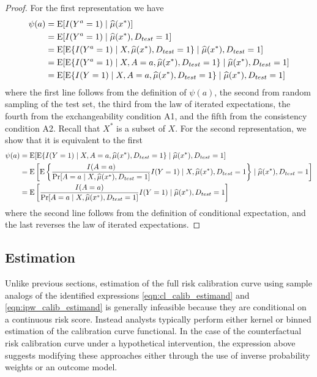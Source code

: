 \begin{proof}
    For the first representation we have 
    \begin{align*}
        \psi(a) &= \operatorname{E}[I(Y^a = 1) \mid \widehat{\mu}(x^*)] \\
        & = \operatorname{E}[I(Y^a = 1) \mid \widehat{\mu}(x^*), D_{test} = 1] \\
        & = \operatorname{E}[\operatorname{E}\{I(Y^a = 1) \mid X, \widehat{\mu}(x^*), D_{test} = 1\}\mid \widehat{\mu}(x^*), D_{test} = 1] \\
        & = \operatorname{E}[\operatorname{E}\{I(Y^a = 1) \mid X, A = a, \widehat{\mu}(x^*), D_{test} = 1\}\mid \widehat{\mu}(x^*), D_{test} = 1] \\
        & = \operatorname{E}[\operatorname{E}\{I(Y = 1) \mid X, A = a, \widehat{\mu}(x^*), D_{test} = 1\}\mid \widehat{\mu}(x^*), D_{test} = 1]
    \end{align*}
    where the first line follows from the definition of $\psi(a)$, the second from random sampling of the test set, the third from the law of iterated expectations, the fourth from the exchangeability condition A1, and the fifth from the consistency condition A2. Recall that $X^*$ is a subset of $X$. For the second representation, we show that it is equivalent to the first 
    \begin{align*}
        \psi(a) &= \operatorname{E}[\operatorname{E}\{I(Y = 1) \mid X, A = a, \widehat{\mu}(x^*), D_{test} = 1\}\mid \widehat{\mu}(x^*), D_{test} = 1] \\
        &= \operatorname{E}\left[\operatorname{E}\left\{\frac{I(A = a)}{\Pr[A = a \mid X, \widehat{\mu}(x^*), D_{test} = 1]} I(Y=1) \mid X, \widehat{\mu}(x^*), D_{test} = 1\right\}\mid \widehat{\mu}(x^*), D_{test} = 1\right] \\
        &= \operatorname{E}\left[\frac{I(A = a)}{\Pr[A = a \mid X, \widehat{\mu}(x^*), D_{test} = 1]} I(Y=1) \mid \widehat{\mu}(x^*), D_{test} = 1\right]
    \end{align*}
    where the second line follows from the definition of conditional expectation, and the last reverses the law of iterated expectations.
\end{proof}

\subsection{Estimation}
Unlike previous sections, estimation of the full risk calibration curve using sample analogs of the identified expressions \ref{eqn:cl_calib_estimand} and \ref{eqn:ipw_calib_estimand} is generally infeasible because they are conditional on a continuous risk score. Instead analysts typically perform either kernel or binned estimation of the calibration curve functional. In the case of the counterfactual risk calibration curve under a hypothetical intervention, the expression above suggests modifying these approaches either through the use of inverse probability weights or an outcome model. 


